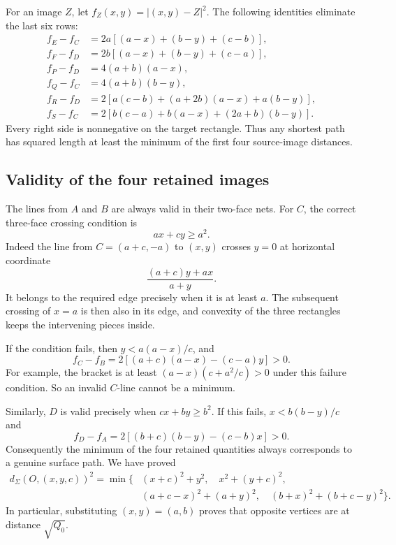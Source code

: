 \documentclass[11pt]{article}
\theoremstyle{definition}
\newcommand{\surf}{\Sigma}
\newcommand{\dist}{d_{\surf}}
\newcommand{\sqzero}{Q_0}
\begin{document}
For an image \(Z\), let \(f_Z(x,y)=|(x,y)-Z|^2\). The following
identities eliminate the last six rows:
\begin{align*}
f_E-f_C&=2a[(a-x)+(b-y)+(c-b)],\\
f_F-f_D&=2b[(a-x)+(b-y)+(c-a)],\\
f_P-f_D&=4(a+b)(a-x),\\
f_Q-f_C&=4(a+b)(b-y),\\
f_R-f_D&=2[a(c-b)+(a+2b)(a-x)+a(b-y)],\\
f_S-f_C&=2[b(c-a)+b(a-x)+(2a+b)(b-y)].
\end{align*}
Every right side is nonnegative on the target rectangle. Thus any
shortest path has squared length at least the minimum of the first
four source-image distances.

\subsection{Validity of the four retained images}

The lines from \(A\) and \(B\) are always valid in their two-face nets.
For \(C\), the correct three-face crossing condition is
\[
ax+cy\ge a^2.
\]
Indeed the line from \(C=(a+c,-a)\) to \((x,y)\) crosses \(y=0\)
at horizontal coordinate
\[
\frac{(a+c)y+ax}{a+y}.
\]
It belongs to the required edge precisely when it is at least \(a\).
The subsequent crossing of \(x=a\) is then also in its edge, and
convexity of the three rectangles keeps the intervening pieces inside.

If the condition fails, then \(y<a(a-x)/c\), and
\[
f_C-f_B=2[(a+c)(a-x)-(c-a)y]>0.
\]
For example, the bracket is at least
\((a-x)(c+a^2/c)>0\) under this failure condition.
So an invalid \(C\)-line cannot be a minimum.

Similarly, \(D\) is valid precisely when \(cx+by\ge b^2\).
If this fails, \(x<b(b-y)/c\) and
\[
f_D-f_A=2[(b+c)(b-y)-(c-b)x]>0.
\]
Consequently the minimum of the four retained quantities always
corresponds to a genuine surface path. We have proved
\begin{equation}\label{eq:four}
\begin{split}
\dist(O,(x,y,c))^2=\min\{&
(x+c)^2+y^2,\quad x^2+(y+c)^2,\\
&(a+c-x)^2+(a+y)^2,\quad
(b+x)^2+(b+c-y)^2\}.
\end{split}
\end{equation}
In particular, substituting \((x,y)=(a,b)\) proves that opposite
vertices are at distance \(\sqrt{\sqzero}\).
\end{document}
